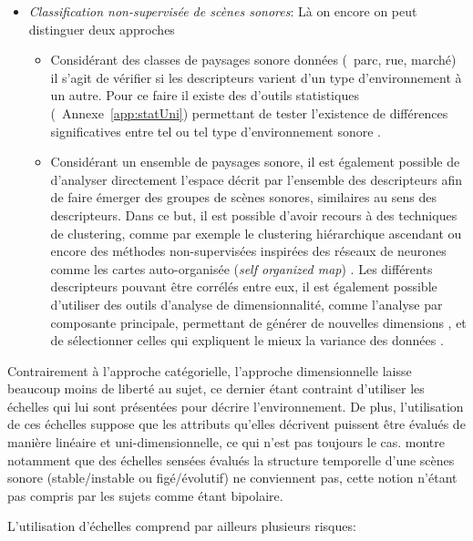 \begin{itemize}
\item \emph{Classification non-supervisée de scènes sonores}: Là on encore on peut distinguer deux approches

\begin{itemize}
\item Considérant des classes de paysages sonore données (\eg~parc, rue, marché) il s'agit de vérifier si les descripteurs varient  d'un type d'environnement à un autre. Pour ce faire il existe des d'outils statistiques (\Cf~Annexe~\ref{app:statUni}) permettant de tester l'existence de différences significatives entre tel ou tel type d'environnement sonore \citep{hong2013designing}. 
\item Considérant un ensemble de paysages sonore, il est également possible de d'analyser directement l'espace décrit par l'ensemble des descripteurs afin de faire émerger des groupes de scènes sonores, similaires au sens des descripteurs. Dans ce but, il est possible d'avoir recours à des techniques de clustering, comme par exemple le clustering hiérarchique ascendant \citep{torija2013application} ou encore des méthodes non-supervisées inspirées des réseaux de neurones comme les cartes auto-organisée (\emph{self organized map}) \citep{ricciardi2015sound}. Les différents descripteurs pouvant être corrélés entre eux, il est également possible d'utiliser des outils d'analyse de dimensionnalité, comme l'analyse par composante principale, permettant de générer de nouvelles dimensions , et de sélectionner celles qui expliquent le mieux la variance des données . 
\end{itemize}

\end{itemize}

Contrairement à l'approche catégorielle, l'approche dimensionnelle laisse beaucoup moins de  liberté au sujet, ce dernier étant contraint d'utiliser les échelles qui lui sont présentées pour décrire l'environnement. De plus, l'utilisation de ces échelles suppose que les attributs qu'elles décrivent puissent être évalués de manière linéaire et uni-dimensionnelle, ce qui n'est pas toujours le cas. \citep{raimbault2006qualitative} montre notamment que des échelles sensées évalués la structure temporelle d'une scènes sonore (stable/instable ou figé/évolutif) ne conviennent pas, cette notion n'étant pas compris par les sujets comme étant bipolaire.

L'utilisation d'échelles comprend par ailleurs plusieurs risques:

